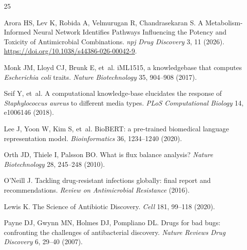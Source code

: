 \documentclass[12pt,a4paper]{article}
\begin{document}




\begin{thebibliography}{25}

Arora HS, Lev K, Robida A, Velmurugan R, Chandrasekaran S.
\newblock A Metabolism-Informed Neural Network Identifies Pathways Influencing the Potency and Toxicity of Antimicrobial Combinations.
\newblock \textit{npj Drug Discovery} 3, 11 (2026). \url{https://doi.org/10.1038/s44386-026-00042-9}.

Monk JM, Lloyd CJ, Brunk E, et~al.
\newblock iML1515, a knowledgebase that computes \textit{Escherichia coli} traits.
\newblock \textit{Nature Biotechnology} 35, 904--908 (2017).

Seif Y, et~al.
\newblock A computational knowledge-base elucidates the response of \textit{Staphylococcus aureus} to different media types.
\newblock \textit{PLoS Computational Biology} 14, e1006146 (2018).

Lee J, Yoon W, Kim S, et~al.
\newblock BioBERT: a pre-trained biomedical language representation model.
\newblock \textit{Bioinformatics} 36, 1234--1240 (2020).

Orth JD, Thiele I, Palsson BO.
\newblock What is flux balance analysis?
\newblock \textit{Nature Biotechnology} 28, 245--248 (2010).

O'Neill J.
\newblock Tackling drug-resistant infections globally: final report and recommendations.
\newblock \textit{Review on Antimicrobial Resistance} (2016).

Lewis K.
\newblock The Science of Antibiotic Discovery.
\newblock \textit{Cell} 181, 99--118 (2020).

Payne DJ, Gwynn MN, Holmes DJ, Pompliano DL.
\newblock Drugs for bad bugs: confronting the challenges of antibacterial discovery.
\newblock \textit{Nature Reviews Drug Discovery} 6, 29--40 (2007).


\end{thebibliography}
\end{document}
